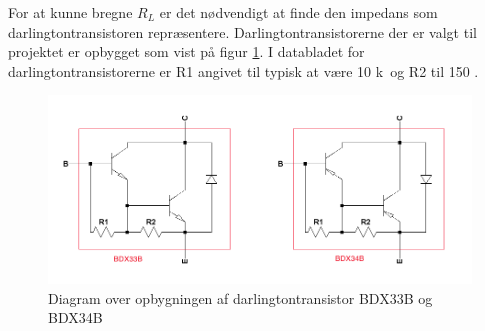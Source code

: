 For at kunne bregne $R_L$ er det nødvendigt at finde den impedans som darlingtontransistoren repræsentere. Darlingtontransistorerne der er valgt til projektet er opbygget som vist på figur \ref{darlington_diagram}. I databladet for darlingtontransistorerne   er R1 angivet til typisk at være 10 k\ohm~og R2 til 150 \ohm.

\begin{figure}[h]
\centering
\includegraphics[width=\textwidth]{teknisk/effektforstaerker/darlingtontransistor_opbygning.png}
\caption{Diagram over opbygningen af darlingtontransistor BDX33B og BDX34B}
\label{darlington_diagram}
\end{figure}

